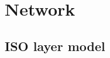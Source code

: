 \documentclass[a4paper]{book}%
\begin{document}
\section{Network}
\subsection{ISO layer model}


\end{document}
